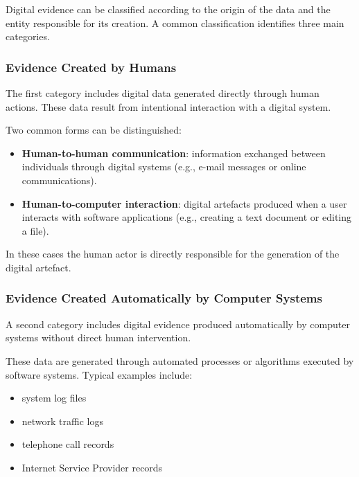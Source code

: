 \noindent
Digital evidence can be classified according to the origin of the data and the entity responsible for its creation. A common classification identifies three main categories.

\medskip

\subsubsection{Evidence Created by Humans}

\noindent
The first category includes digital data generated directly through human actions. These data result from intentional interaction with a digital system.

\medskip

\noindent
Two common forms can be distinguished:

\begin{itemize}
\item \textbf{Human-to-human communication}: information exchanged between individuals through digital systems (e.g., e-mail messages or online communications).
\item \textbf{Human-to-computer interaction}: digital artefacts produced when a user interacts with software applications (e.g., creating a text document or editing a file).
\end{itemize}

\medskip

\noindent
In these cases the human actor is directly responsible for the generation of the digital artefact.

\medskip

\subsubsection{Evidence Created Automatically by Computer Systems}

\noindent
A second category includes digital evidence produced automatically by computer systems without direct human intervention.

\medskip

\noindent
These data are generated through automated processes or algorithms executed by software systems. Typical examples include:

\begin{itemize}
\item system log files
\item network traffic logs
\item telephone call records
\item Internet Service Provider records
\end{itemize}


